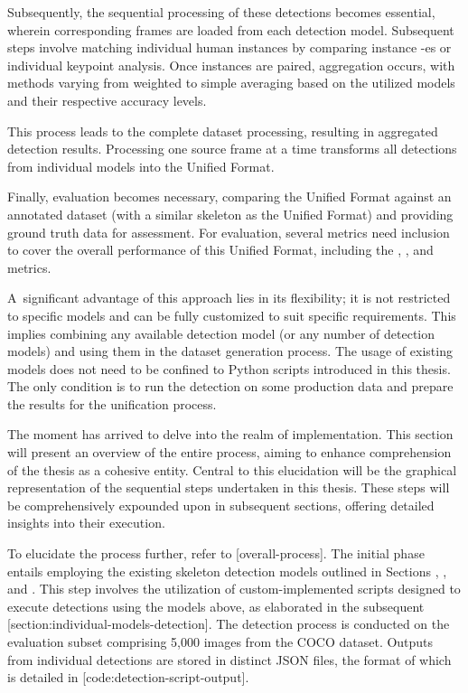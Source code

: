 Subsequently, the sequential processing of these detections becomes essential, wherein corresponding frames are loaded from each detection model. Subsequent steps involve matching individual human instances by comparing instance {\bf \BBOX}-es or individual keypoint analysis. Once instances are paired, aggregation occurs, with methods varying from weighted to simple averaging based on the utilized models and their respective accuracy levels.

This process leads to the complete dataset processing, resulting in aggregated detection results. Processing one source frame at a time transforms all detections from individual models into the Unified Format.

Finally, evaluation becomes necessary, comparing the Unified Format against an annotated dataset (with a similar skeleton as the Unified Format) and providing ground truth data for assessment. For evaluation, several metrics need inclusion to cover the overall performance of this Unified Format, including the {\bf \APE}, {\bf \MSE}, and {\bf \OKS} metrics.

A~significant advantage of this approach lies in its flexibility; it is not restricted to specific models and can be fully customized to suit specific requirements. This implies combining any available detection model (or any number of detection models) and using them in the dataset generation process. The usage of existing models does not need to be confined to Python scripts introduced in this thesis. The only condition is to run the detection on some production data and prepare the results for the unification process.


The moment has arrived to delve into the realm of implementation. This section will present an overview of the entire process, aiming to enhance comprehension of the thesis as a cohesive entity. Central to this elucidation will be the graphical representation of the sequential steps undertaken in this thesis. These steps will be comprehensively expounded upon in subsequent sections, offering detailed insights into their execution.

To elucidate the process further, refer to [overall-process]. The initial phase entails employing the existing skeleton detection models outlined in Sections , , and . This step involves the utilization of custom-implemented scripts designed to execute detections using the models above, as elaborated in the subsequent [section:individual-models-detection]. The detection process is conducted on the evaluation subset comprising 5,000 images from the COCO dataset. Outputs from individual detections are stored in distinct JSON files, the format of which is detailed in [code:detection-script-output].

